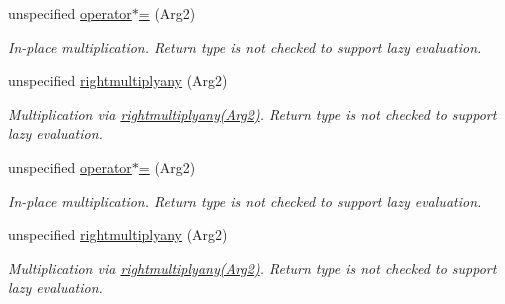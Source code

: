 \begin{DoxyCompactItemize}
\item 
\hypertarget{structRFFGen_1_1Concepts_1_1MultiplicationConcept_a65cf060bcfd7bd39b527de6c87056539}{unspecified \hyperlink{structRFFGen_1_1Concepts_1_1MultiplicationConcept_a65cf060bcfd7bd39b527de6c87056539}{operator$\ast$=} (Arg2)}\label{structRFFGen_1_1Concepts_1_1MultiplicationConcept_a65cf060bcfd7bd39b527de6c87056539}

\begin{DoxyCompactList}\small\item\em In-\/place multiplication. Return type is not checked to support lazy evaluation. \end{DoxyCompactList}\item 
\hypertarget{structRFFGen_1_1Concepts_1_1MultiplicationConcept_ae876451286ab0e902a5cec841ad01f2e}{unspecified \hyperlink{structRFFGen_1_1Concepts_1_1MultiplicationConcept_ae876451286ab0e902a5cec841ad01f2e}{rightmultiplyany} (Arg2)}\label{structRFFGen_1_1Concepts_1_1MultiplicationConcept_ae876451286ab0e902a5cec841ad01f2e}

\begin{DoxyCompactList}\small\item\em Multiplication via \hyperlink{structRFFGen_1_1Concepts_1_1MultiplicationConcept_ae876451286ab0e902a5cec841ad01f2e}{rightmultiplyany(\-Arg2)}. Return type is not checked to support lazy evaluation. \end{DoxyCompactList}\item 
\hypertarget{structRFFGen_1_1Concepts_1_1MultiplicationConcept_a65cf060bcfd7bd39b527de6c87056539}{unspecified \hyperlink{structRFFGen_1_1Concepts_1_1MultiplicationConcept_a65cf060bcfd7bd39b527de6c87056539}{operator$\ast$=} (Arg2)}\label{structRFFGen_1_1Concepts_1_1MultiplicationConcept_a65cf060bcfd7bd39b527de6c87056539}

\begin{DoxyCompactList}\small\item\em In-\/place multiplication. Return type is not checked to support lazy evaluation. \end{DoxyCompactList}\item 
\hypertarget{structRFFGen_1_1Concepts_1_1MultiplicationConcept_ae876451286ab0e902a5cec841ad01f2e}{unspecified \hyperlink{structRFFGen_1_1Concepts_1_1MultiplicationConcept_ae876451286ab0e902a5cec841ad01f2e}{rightmultiplyany} (Arg2)}\label{structRFFGen_1_1Concepts_1_1MultiplicationConcept_ae876451286ab0e902a5cec841ad01f2e}

\begin{DoxyCompactList}\small\item\em Multiplication via \hyperlink{structRFFGen_1_1Concepts_1_1MultiplicationConcept_ae876451286ab0e902a5cec841ad01f2e}{rightmultiplyany(\-Arg2)}. Return type is not checked to support lazy evaluation. \end{DoxyCompactList}\end{DoxyCompactItemize}


